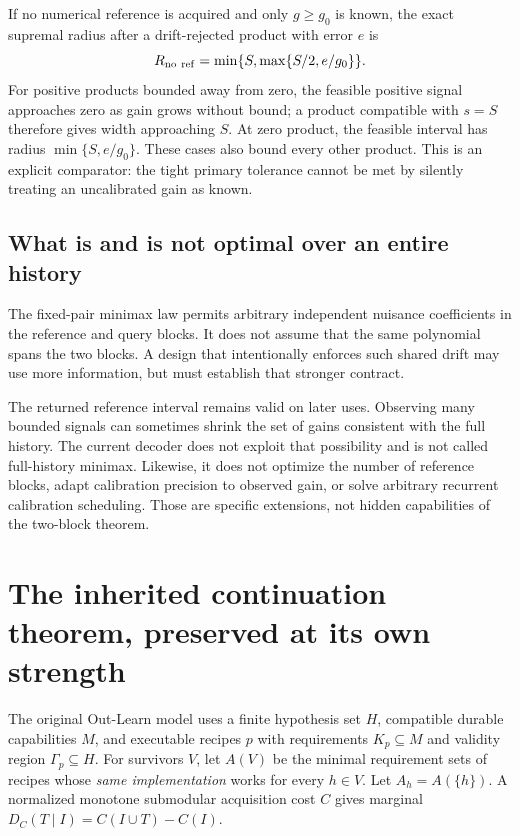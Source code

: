\documentclass[11pt,letterpaper]{article}
\theoremstyle{definition}\newtheorem{definition}[theorem]{Definition}
\theoremstyle{remark}\newtheorem{remark}[theorem]{Remark}
\begin{document}
If no numerical reference is acquired and only $g\ge g_0$ is known, the exact supremal radius after a drift-rejected product with error $e$ is
\begin{equation}
 R_{\rm no\ ref}=\min\{S,\max\{S/2,e/g_0\}\}.
\end{equation}
For positive products bounded away from zero, the feasible positive signal approaches zero as gain grows without bound; a product compatible with $s=S$ therefore gives width approaching $S$. At zero product, the feasible interval has radius $\min\{S,e/g_0\}$. These cases also bound every other product. This is an explicit comparator: the tight primary tolerance cannot be met by silently treating an uncalibrated gain as known.

\subsection{What is and is not optimal over an entire history}
The fixed-pair minimax law permits arbitrary independent nuisance coefficients in the reference and query blocks. It does not assume that the same polynomial spans the two blocks. A design that intentionally enforces such shared drift may use more information, but must establish that stronger contract.

The returned reference interval remains valid on later uses. Observing many bounded signals can sometimes shrink the set of gains consistent with the full history. The current decoder does not exploit that possibility and is not called full-history minimax. Likewise, it does not optimize the number of reference blocks, adapt calibration precision to observed gain, or solve arbitrary recurrent calibration scheduling. Those are specific extensions, not hidden capabilities of the two-block theorem.

\section{The inherited continuation theorem, preserved at its own strength}
\label{app:finite}
The original Out-Learn model uses a finite hypothesis set $H$, compatible durable capabilities $M$, and executable recipes $p$ with requirements $K_p\subseteq M$ and validity region $\Gamma_p\subseteq H$. For survivors $V$, let $A(V)$ be the minimal requirement sets of recipes whose \emph{same implementation} works for every $h\in V$. Let $A_h=A(\{h\})$. A normalized monotone submodular acquisition cost $C$ gives marginal $D_C(T\mid I)=C(I\cup T)-C(I)$.
\end{document}
